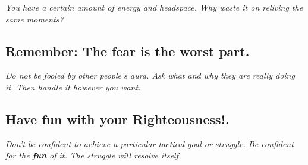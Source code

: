 \documentclass[12pt]{article}
\begin{document}
\textit{You have a certain amount of energy and headspace.  Why waste it on reliving the same moments?}
\pagebreak



\subsection*{Remember: The fear is the worst part.}

\textit{Do not be fooled by other people's aura.  Ask what and why they are really doing it.  Then handle it however you want.}

\pagebreak

\subsection*{Have fun with your Righteousness!.}
\textit{Don't be confident to achieve a particular tactical goal or struggle.  Be confident for the \textbf{fun} of it.  The struggle will resolve itself.}
\end{document}
